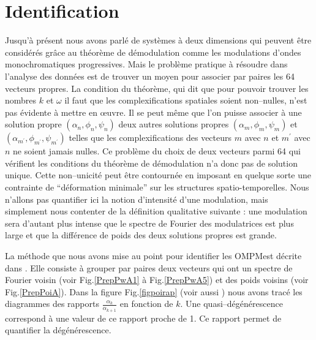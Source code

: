 \documentclass{book}
\begin{document}
\section{Identification}\label{sectionidentification}
Jusqu'\`a pr\'esent nous avons parl\'e de syst\`emes \`a deux
dimensions  qui
peuvent \^etre 
consid\'er\'es gr\^ace au th\'eor\`eme de d\'emodulation comme les
modulations 
d'ondes monochromatiques progressives.
Mais le probl\`eme pratique \`a r\'esoudre dans l'analyse des
donn\'ees est de 
trouver un moyen pour associer par paires les 64 vecteurs propres.
La condition du th\'eor\`eme, qui dit que pour pouvoir trouver les nombres
$k$ et $\omega$ il faut que les complexifications spatiales soient
non--nulles, n'est pas \'evidente \`a mettre en \oe uvre. Il se peut
m\^eme que 
l'on puisse associer \`a une solution propre $(\alpha_n,\phi_n,\psi_n)$
deux autres solutions propres $(\alpha_m,\phi_m,\psi_m)$ et
$(\alpha_{m^\prime},\phi_{m^\prime},\psi_{m^\prime})$ telles que les
complexifications des vecteurs $m$ avec $n$ et $m^\prime$ avec $n$ ne
soient jamais nulles.
Ce probl\`eme du choix de deux vecteurs parmi 64 qui v\'erifient les
conditions du th\'eor\`eme de d\'emodulation n'a donc pas de solution
unique.
Cette non--unicit\'e peut \^etre contourn\'ee en imposant en quelque sorte
une contrainte de ``d\'eformation minimale'' sur les structures
spatio-temporelles. Nous n'allons pas quantifier ici la notion
d'intensit\'e  d'une modulation, mais simplement nous contenter de la
d\'efinition qualitative suivante : une modulation sera d'autant plus
intense que le
spectre de Fourier des modulatrices est plus large et que la
diff\'erence de poids des deux solutions propres est grande.


La m\'ethode que nous avons mise au point pour identifier les
OMPMest d\'ecrite dans \cite{Madon96a}.
Elle consiste \`a grouper par paires deux vecteurs qui ont un spectre
de Fourier voisin (voir Fig.\ref{PrepPwA1} \`a Fig.\ref{PrepPwA5})
et des poids voisins (voir Fig.\ref{PrepPoiA}). 
Dans la figure Fig.\ref{figpoirap} (voir aussi \cite{Madon96a}) nous avons
trac\'e les diagrammes 
des rapports $\frac{\alpha_k}{\alpha_{k+1}}$ en fonction de $k$. Une
quasi--d\'eg\'en\'erescence correspond \`a une valeur de ce rapport
proche de  1. Ce rapport permet de quantifier la d\'eg\'en\'erescence.
\end{document}
